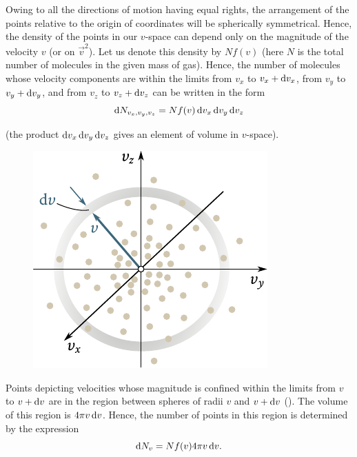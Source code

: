 Owing to all the directions of motion having equal rights, the arrangement of the points relative to the origin of coordinates will be spherically symmetrical. Hence, the density of the points in our $v$-space can depend only on the magnitude of the velocity $v$ (or on $\vec{v}^2$). Let us denote this density by $Nf(v)$ (here $N$ is the total number of molecules in the given mass of gas). Hence, the number of molecules whose velocity components are within the limits from $v_x$ to $v_x+\mathrm{d} v_x$, from $v_y$ to $v_y+\mathrm{d} v_y$, and from $v_z$ to $v_z+\mathrm{d} v_z$ can be written in the form
\begin{equation}\label{eq:11_40}
	\mathrm{d} N_{v_x, v_y, v_z} = Nf(v)\,\mathrm{d} v_x\,\mathrm{d} v_y\,\mathrm{d} v_z
\end{equation}

\noindent
(the product $\mathrm{d} v_x\,\mathrm{d} v_y\,\mathrm{d} v_z$ gives an element of volume in $v$-space).

\begin{figure}[t]
	\begin{center}
		\includegraphics[scale=1.0]{figures/ch_11/fig_11_15.pdf}
		\caption[]{}
		\label{fig:11_15}
	\end{center}
	\vspace{-0.8cm}
\end{figure}

Points depicting velocities whose magnitude is confined within the limits from $v$ to $v+\mathrm{d} v$ are in the region between spheres of radii $v$ and $v+\mathrm{d} v$ (). The volume of this region is $4\pi v\,\mathrm{d} v$. Hence, the number of points in this region is determined by the expression
\begin{equation}\label{eq:11_41}
	\mathrm{d} N_v = Nf(v) 4\pi v\,\mathrm{d} v.
\end{equation}

